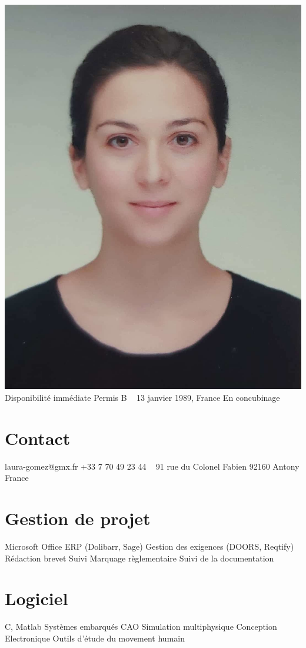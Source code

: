 \documentclass{cv-style}     %
\begin{document}


\begin{aside}
    \includegraphics[width=.8\columnwidth]{img/LG}
    Disponibilité immédiate
    Permis B
    ~
    13 janvier 1989, France
    En concubinage
    \section{Contact}
    laura-gomez@gmx.fr
    +33 7 70 49 23 44
    ~
    91 rue du Colonel Fabien
    92160 Antony
    France
    \section{Gestion de projet}
    Microsoft Office
    ERP (Dolibarr, Sage)
    Gestion des exigences (DOORS, Reqtify)
    ~
    Rédaction brevet
    Suivi Marquage règlementaire
    Suivi de la documentation
    \section{Logiciel}
    C, Matlab
    Systèmes embarqués %
    CAO %
    Simulation multiphysique %
    Conception Electronique %
    Outils d’étude du movement humain %

\end{aside}
\end{document}
